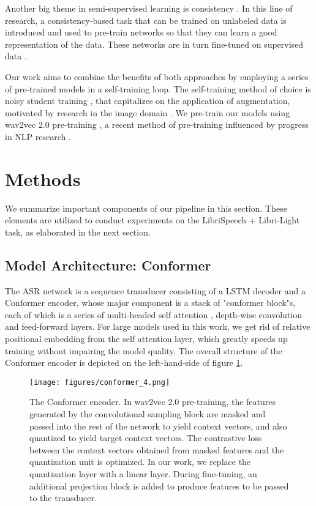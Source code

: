 \documentclass[dvipsnames]{article}
\begin{document}
Another big theme in semi-supervised learning is consistency \cite{xie2019unsupervised,zhai2019s4l,sohn2020fixmatch}. In this line of research, a consistency-based task that can be trained on unlabeled data is introduced and used to pre-train networks so that they can learn a good representation of the data. These networks are in turn fine-tuned on supervised data \cite{hsu2018extracting, chung2018speech2vec, chung2019autoregressive, chorowski2019unsupervised, schneider2019wav2vec, baevski2019vqwav2vec, ling2019deep}.

Our work aims to combine the benefits of both approaches by employing a series of pre-trained models in a self-training loop. The self-training method of choice is noisy student training \cite{nstasr}, that capitalizes on the application of augmentation, motivated by research in the image domain \cite{nst,he2020revisiting}. We pre-train our models using wav2vec 2.0 pre-training \cite{wav2vec2}, a recent method of pre-training influenced by progress in NLP research \cite{bert}.

\section{Methods}

We summarize important components of our pipeline in this section. These elements are utilized to conduct experiments on the LibriSpeech + Libri-Light task, as elaborated in the next section.

\subsection{Model Architecture: Conformer}

The ASR network is a sequence transducer \cite{rnnt} consisting of a LSTM \cite{lstm} decoder and a Conformer \cite{conformer} encoder, whose major component is a stack of "conformer block"s, each of which is a series of multi-headed self attention \cite{vaswani2017attention}, depth-wise convolution and feed-forward layers. For large models used in this work, we get rid of relative positional embedding \cite{dai2019transformer} from the self attention layer, which greatly speeds up training without impairing the model quality. The overall structure of the Conformer encoder is depicted on the left-hand-side of figure \ref{f:conformer}.

\begin{figure}[h!]
\centering
\texttt{[image: figures/conformer\_4.png]}
\vskip 0.05in
\caption{The Conformer encoder. In wav2vec 2.0 pre-training, the features generated by the convolutional sampling block are masked and passed into the rest of the network to yield context vectors, and also quantized to yield target context vectors. The contrastive loss between the context vectors obtained from masked features and the quantization unit is optimized. In our work, we replace the quantization layer with a linear layer. During fine-tuning, an additional projection block is added to produce features to be passed to the transducer.}
\label{f:conformer}
\end{figure}
\end{document}
